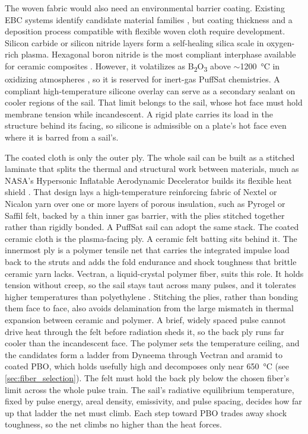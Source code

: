 \documentclass{article}
\begin{document}
The woven fabric would also need an environmental barrier coating. Existing EBC systems identify candidate material families \cite{ebc_review}, but coating thickness and a deposition process compatible with flexible woven cloth require development. Silicon carbide or silicon nitride layers \cite{silicon_ceramic_oxidation} form a self-healing silica scale in oxygen-rich plasma. Hexagonal boron nitride is the most compliant interphase available for ceramic composites \cite{uhtcmc_review}. However, it volatilizes as B\textsubscript{2}O\textsubscript{3} above $\sim$\SI{1200}{\celsius} in oxidizing atmospheres \cite{bn_oxidation}, so it is reserved for inert-gas PuffSat chemistries. A compliant high-temperature silicone overlay \cite{silicon_coatings} can serve as a secondary sealant on cooler regions of the sail. That limit belongs to the sail, whose hot face must hold membrane tension while incandescent. A rigid plate carries its load in the structure behind its facing, so silicone is admissible on a plate's hot face even where it is barred from a sail's.

The coated cloth is only the outer ply. The whole sail can be built as a stitched laminate that splits the thermal and structural work between materials, much as NASA's Hypersonic Inflatable Aerodynamic Decelerator builds its flexible heat shield \cite{hiad_flexible_tps}. That design lays a high-temperature reinforcing fabric of Nextel or Nicalon yarn over one or more layers of porous insulation, such as Pyrogel or Saffil felt, backed by a thin inner gas barrier, with the plies stitched together rather than rigidly bonded. A PuffSat sail can adopt the same stack. The coated ceramic cloth is the plasma-facing ply. A ceramic felt batting sits behind it. The innermost ply is a polymer tensile net that carries the integrated impulse load back to the struts and adds the fold endurance and shock toughness that brittle ceramic yarn lacks. Vectran, a liquid-crystal polymer fiber, suits this role. It holds tension without creep, so the sail stays taut across many pulses, and it tolerates higher temperatures than polyethylene \cite{vectran_brochure}. Stitching the plies, rather than bonding them face to face, also avoids delamination from the large mismatch in thermal expansion between ceramic and polymer. A brief, widely spaced pulse cannot drive heat through the felt before radiation sheds it, so the back ply runs far cooler than the incandescent face. The polymer sets the temperature ceiling, and the candidates form a ladder from Dyneema through Vectran and aramid to coated PBO, which holds usefully high and decomposes only near \SI{650}{\celsius} \cite{zylon_technical_info} (see \autoref{sec:fiber_selection}). The felt must hold the back ply below the chosen fiber's limit across the whole pulse train. The sail's radiative equilibrium temperature, fixed by pulse energy, areal density, emissivity, and pulse spacing, decides how far up that ladder the net must climb. Each step toward PBO trades away shock toughness, so the net climbs no higher than the heat forces.
\end{document}

